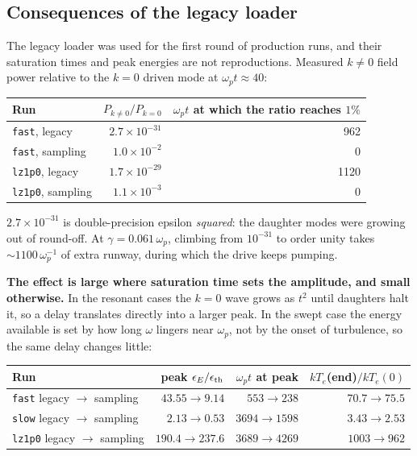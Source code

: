 \documentclass[11pt,a4paper]{article}
\newcommand{\code}[1]{\texttt{\small #1}}
\newcommand{\wpt}{\omega_p t}
\begin{document}
\subsection{Consequences of the legacy loader}
\label{sec:quietrelax}

The legacy loader was used for the first round of production runs, and their
saturation times and peak energies are not reproductions. Measured $k\neq0$ field
power relative to the $k=0$ driven mode at $\wpt\approx 40$:

\begin{center}\small
\begin{tabular}{@{}lrr@{}}
\toprule
Run & $P_{k\neq0}/P_{k=0}$ & $\wpt$ at which the ratio reaches $1\%$ \\
\midrule
\code{fast}, legacy    & $2.7\times10^{-31}$ & 962 \\
\code{fast}, sampling  & $1.0\times10^{-2}$  & 0 \\
\code{lz1p0}, legacy   & $1.7\times10^{-29}$ & 1120 \\
\code{lz1p0}, sampling & $1.1\times10^{-3}$  & 0 \\
\bottomrule
\end{tabular}
\end{center}

$2.7\times10^{-31}$ is double-precision epsilon \emph{squared}: the daughter modes
were growing out of round-off. At $\gamma = 0.061\,\omega_p$, climbing from $10^{-31}$
to order unity takes ${\sim}1100\,\omega_p^{-1}$ of extra runway, during which the
drive keeps pumping.

\textbf{The effect is large where saturation time sets the amplitude, and small
otherwise.} In the resonant cases the $k=0$ wave grows as $t^2$ until daughters halt
it, so a delay translates directly into a larger peak. In the swept case the energy
available is set by how long $\omega$ lingers near $\omega_p$, not by the onset of
turbulence, so the same delay changes little:

\begin{center}\small
\begin{tabular}{@{}lrrr@{}}
\toprule
Run & peak $\epsilon_E/\epsilon_{\rm th}$ & $\wpt$ at peak & $kT_e$(end)$/kT_e(0)$ \\
\midrule
\code{fast}  legacy $\rightarrow$ sampling & $43.55 \rightarrow 9.14$ & $553 \rightarrow 238$ & $70.7 \rightarrow 75.5$ \\
\code{slow}  legacy $\rightarrow$ sampling & $2.13 \rightarrow 0.53$  & $3694 \rightarrow 1598$ & $3.43 \rightarrow 2.53$ \\
\code{lz1p0} legacy $\rightarrow$ sampling & $190.4 \rightarrow 237.6$ & $3689 \rightarrow 4269$ & $1003 \rightarrow 962$ \\
\bottomrule
\end{tabular}
\end{center}
\end{document}
